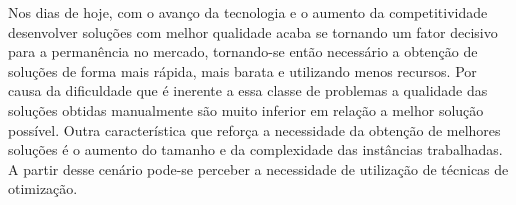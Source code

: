  
  
Nos dias de hoje, com o avanço da tecnologia e o aumento da competitividade
desenvolver soluções com melhor qualidade acaba se tornando um fator decisivo
para a permanência no mercado, tornando-se então necessário a obtenção de
soluções de forma mais rápida, mais barata e utilizando menos recursos. Por
causa da dificuldade que é inerente a essa classe de problemas a qualidade das
soluções obtidas manualmente são muito inferior em relação a melhor solução
possível. Outra característica que reforça a necessidade da obtenção de melhores soluções é o
aumento do tamanho e da complexidade das instâncias trabalhadas. A partir desse
cenário pode-se perceber a necessidade de utilização de técnicas de otimização.

  



